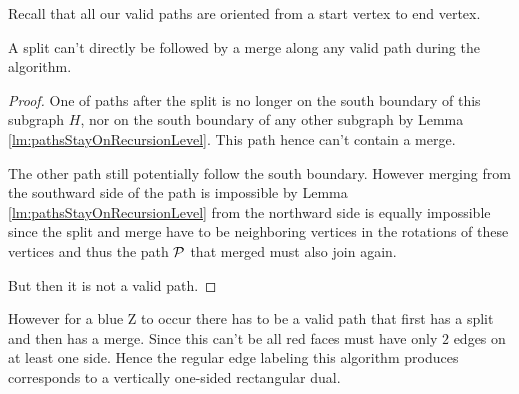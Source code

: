   Recall that all our valid paths are oriented from a start vertex to end vertex.

  \begin{lemma}
    A split can't directly be followed by a merge along any valid path during the algorithm.
  \end{lemma}
  \begin{proof}
    One of paths after the split is no longer on the south boundary of this subgraph $H$, nor on the south boundary of any other subgraph by Lemma \ref{lm:pathsStayOnRecursionLevel}. This path hence can't contain a merge.

    The other path still potentially follow the south boundary. However merging from the southward side of the path is impossible by Lemma \ref{lm:pathsStayOnRecursionLevel} from the northward side is equally impossible since the split and merge have to be neighboring vertices in the rotations of these vertices and thus the path $\P$ that merged must also join again.

    But then it is not a valid path.
  \end{proof}

  However for a blue Z to occur there has to be a valid path that first has a split and then has a merge. Since this can't be all red faces must have only $2$ edges on at least one side. Hence the regular edge labeling this algorithm produces corresponds to a vertically one-sided rectangular dual.


